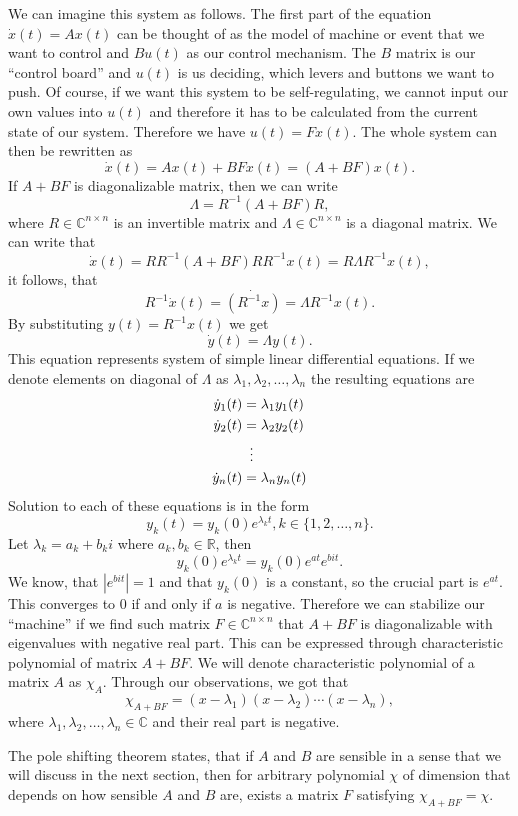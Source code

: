 \documentclass[a4paper,11pt]{article}
\newcommand{\R}{\mathbb{R}}   %
\newcommand{\C}{\mathbb{C}}
\begin{document}
We can imagine this system as follows. The first part of the equation $\dot{x}(t)=Ax(t)$ can be thought of as the model of machine or event that we want to control and $Bu(t)$ as our control mechanism. The $B$ matrix is our ``control board'' and $u(t)$ is us deciding, which levers and buttons we want to push. Of course, if we want this system to be self-regulating, we cannot input our own values into $u(t)$ and therefore it has to be calculated from the current state of our system. Therefore we have $u(t)=Fx(t)$. The whole system can then be rewritten as $$\dot{x}(t)=Ax(t)+BFx(t)=(A+BF)x(t).$$ If $A+BF$ is diagonalizable matrix, then we can write $$\Lambda=R^{-1}(A+BF)R,$$ where $R \in \C ^{n \times n}$ is an invertible matrix and $\Lambda \in \C ^{n \times n}$ is a diagonal matrix. We can write that $$\dot{x}(t)=RR^{-1}(A+BF)RR^{-1}x(t)=R\Lambda R^{-1}x(t),$$ it follows, that $$R^{-1}\dot{x}(t)=\dot{(R^{-1}x)}=\Lambda R^{-1}x(t).$$ By substituting $y(t)=R^{-1}x(t)$ we get $$\dot{y}(t)=\Lambda y(t).$$ This equation represents system of simple linear differential equations. If we denote elements on diagonal of $\Lambda$ as $\lambda_1,\lambda_2,\dots,\lambda_n$ the resulting equations are  
\begin{align*}
  \dot{y}_1(t)&=\lambda_1y_1(t) \\
  \dot{y}_2(t)&=\lambda_2y_2(t) \\
  &\vdotswithin{=} \\
  \dot{y}_n(t)&=\lambda_ny_n(t) 
\end{align*}
Solution to each of these equations is in the form 
$$y_k(t)=y_k(0)e^{\lambda_kt}, k\in\{1,2,\dots,n\}.$$
Let $\lambda_k=a_k+b_ki$ where $a_k,b_k\in \R$, then 
$$y_k(0)e^{\lambda_kt}=y_k(0)e^{at}e^{bit}.$$ 
We know, that $|e^{bit}|=1$ and that $y_k(0)$ is a constant, so the crucial part is $e^{at}$. This converges to 0 if and only if $a$ is negative. Therefore we can stabilize our ``machine'' if we find such matrix $F \in \C^{n \times n}$ that $A+BF$ is diagonalizable with eigenvalues with negative real part. This can be expressed through characteristic polynomial of matrix $A+BF$. We will denote characteristic polynomial of a matrix $A$ as $\chi_A$. Through our observations, we got that $$\chi_{A+BF}=(x-\lambda_1)(x-\lambda_2)\cdots(x-\lambda_n),$$ where $\lambda_1,\lambda_2,\dots,\lambda_n \in \C$ and their real part is negative.

The pole shifting theorem states, that if $A$ and $B$ are sensible in a sense that we will discuss in the next section, then for arbitrary polynomial $\chi$ of dimension that depends on how sensible $A$ and $B$ are, exists a matrix $F$ satisfying $\chi_{A+BF}=\chi$. 
\end{document}
